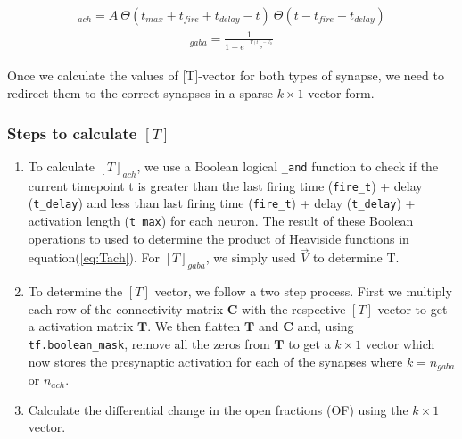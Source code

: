 \documentclass[10pt,letterpaper]{article}
\begin{document}
\begin{eqnarray}[T]_{ach} = A\ \Theta(t_{max}+t_{fire}+t_{delay}-t)\ \Theta(t-t_{fire}-t_{delay})\label{eq:Tach}\end{eqnarray}
\begin{eqnarray}[T]_{gaba} = \frac{1}{1+e^{-\frac{V(t)-V_0}{\sigma}}}
\label{eq:Tgaba}
\end{eqnarray}

Once we calculate the values of [T]-vector for both types of synapse, we need to redirect them to the correct synapses in a sparse $k\times1$ vector form. 

\subsubsection*{Steps to calculate $[T]$}
\begin{enumerate}
\item  To calculate $[T]_{ach}$, we use a Boolean logical \texttt{\_and} function to check if the current timepoint t is greater than the last firing time (\texttt{fire\_t}) + delay (\texttt{t\_delay}) and less than last firing time (\texttt{fire\_t}) + delay (\texttt{t\_delay}) + activation length (\texttt{t\_max}) for each neuron. The result of these Boolean operations to used to determine the product of Heaviside functions in equation(\ref{eq:Tach}). For $[T]_{gaba}$, we simply used $\vec{V}$ to determine T.
\item To determine the $[T]$ vector, we follow a two step process. First we multiply each row of the connectivity matrix $\mathbf{C}$ with the respective $[T]$ vector to get a activation matrix $\mathbf{T}$. We then flatten $\mathbf{T}$ and $\mathbf{C}$ and, using \texttt{tf.boolean\_mask}, remove all the zeros from $\mathbf{T}$ to get a $k\times1$ vector which now stores the presynaptic activation for each of the synapses where $k=n_{gaba}$ or $n_{ach}$.
\item Calculate the differential change in the open fractions (OF) using the $k\times1$ vector.
\end{enumerate}
\end{document}

